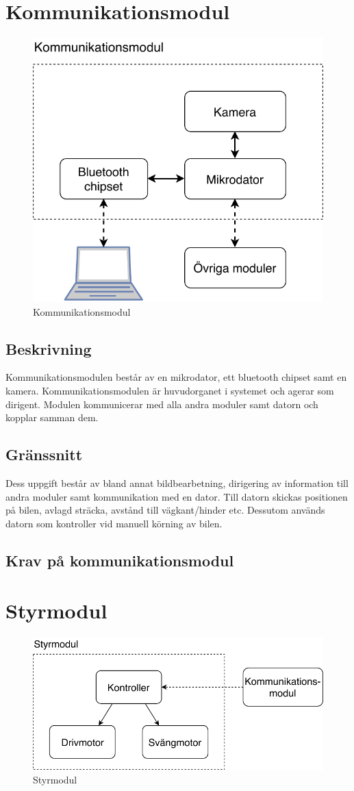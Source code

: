 \documentclass[kravspec/krav.tex]{subfiles}
\begin{document}
\clearpage
\section{Kommunikationsmodul}
\begin{figure}[H]
    \centering
    \includegraphics[height=0.4\linewidth]{kravspec/figures/kommunikationsmodul.pdf}
    \caption{Kommunikationsmodul}
    \label{fig:kommunikationsmodul}
\end{figure}

\subsection{Beskrivning}
Kommunikationsmodulen består av en mikrodator, ett bluetooth chipset samt en
kamera. Kommunikationsmodulen är huvudorganet i systemet och agerar som
dirigent. Modulen kommunicerar med alla andra moduler samt datorn och kopplar
samman dem.

\subsection{Gränssnitt}
Dess uppgift består av bland annat bildbearbetning, dirigering av information
till andra moduler samt kommunikation med en dator. Till datorn skickas
positionen på bilen, avlagd sträcka, avstånd till vägkant/hinder etc. Dessutom
används datorn som kontroller vid manuell körning av bilen.

\subsection{Krav på kommunikationsmodul}
\begin{reqlist}
\end{reqlist}

\clearpage
\section{Styrmodul}
\begin{figure}[h]
    \centering
    \includegraphics[width=0.6\linewidth]{kravspec/figures/styrmodul.pdf}
    \caption{Styrmodul}
    \label{fig:styrmodul}
\end{figure}
\end{document}
